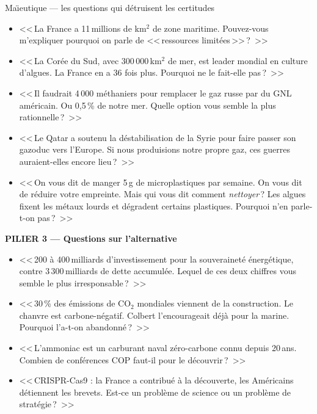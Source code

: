 \documentclass[a4paper,11pt]{article}
\begin{document}
\begin{fichebleu}{Ma\"{\i}eutique --- les questions qui d\'{e}truisent les certitudes}
\begin{itemize}[nosep, label=\color{ModeBleu}]
  \item <<\,La France a 11\,millions de km$^2$ de zone maritime. Pouvez-vous m'expliquer pourquoi on parle de <<\,ressources limit\'{e}es\,>>\,?~>>
  \item <<\,La Cor\'{e}e du Sud, avec 300\,000\,km$^2$ de mer, est leader mondial en culture d'algues. La France en a 36 fois plus. Pourquoi ne le fait-elle pas\,?~>>
  \item <<\,Il faudrait 4\,000 m\'{e}thaniers pour remplacer le gaz russe par du GNL am\'{e}ricain. Ou 0{,}5\,\% de notre mer. Quelle option vous semble la plus rationnelle\,?~>>
  \item <<\,Le Qatar a soutenu la d\'{e}stabilisation de la Syrie pour faire passer son gazoduc vers l'Europe. Si nous produisions notre propre gaz, ces guerres auraient-elles encore lieu\,?~>>
  \item <<\,On vous dit de manger 5\,g de microplastiques par semaine. On vous dit de r\'{e}duire votre empreinte. Mais qui vous dit comment \emph{nettoyer}\,? Les algues fixent les m\'{e}taux lourds et d\'{e}gradent certains plastiques. Pourquoi n'en parle-t-on pas\,?~>>
\end{itemize}

\vspace{0.3cm}
\textbf{\color{ModeBleu}PILIER 3 --- Questions sur l'alternative}

\begin{itemize}[nosep, label=\color{ModeBleu}]
  \item <<\,200 \`{a} 400\,milliards d'investissement pour la souverainet\'{e} \'{e}nerg\'{e}tique, contre 3\,300\,milliards de dette accumul\'{e}e. Lequel de ces deux chiffres vous semble le plus irresponsable\,?~>>
  \item <<\,30\,\% des \'{e}missions de CO$_2$ mondiales viennent de la construction. Le chanvre est carbone-n\'{e}gatif. Colbert l'encourageait d\'{e}j\`{a} pour la marine. Pourquoi l'a-t-on abandonn\'{e}\,?~>>
  \item <<\,L'ammoniac est un carburant naval z\'{e}ro-carbone connu depuis 20\,ans. Combien de conf\'{e}rences COP faut-il pour le d\'{e}couvrir\,?~>>
  \item <<\,CRISPR-Cas9 : la France a contribu\'{e} \`{a} la d\'{e}couverte, les Am\'{e}ricains d\'{e}tiennent les brevets. Est-ce un probl\`{e}me de science ou un probl\`{e}me de strat\'{e}gie\,?~>>
\end{itemize}


\end{fichebleu}
\end{document}
